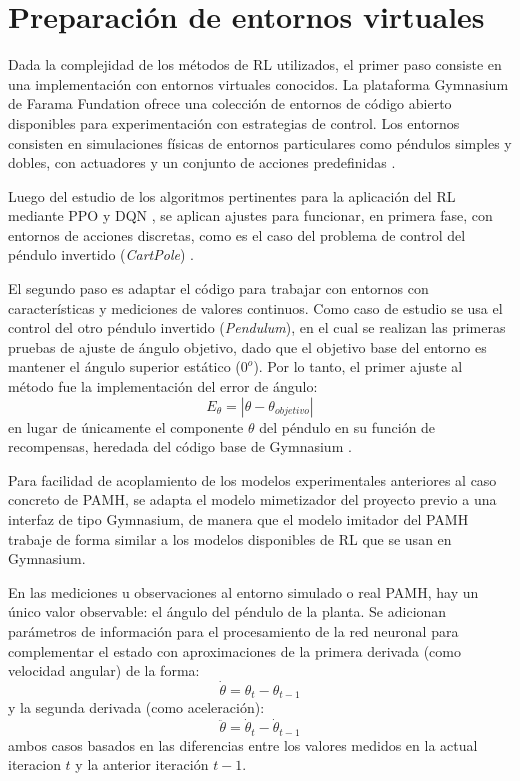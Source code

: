 \section{Preparación de entornos virtuales}

Dada la complejidad de los métodos de RL utilizados, el primer paso consiste en una implementación con entornos virtuales conocidos. La plataforma Gymnasium de Farama Fundation \cite{Gymnasium} ofrece una colección de entornos de código abierto disponibles para experimentación con estrategias de control. Los entornos consisten en simulaciones físicas de entornos particulares como péndulos simples y dobles, con actuadores y un conjunto de acciones predefinidas \cite{Gymnasium}.  

Luego del estudio de los algoritmos pertinentes para la aplicación del RL mediante PPO y DQN \cite{PPObase} \cite{DQNbase}, se aplican ajustes para funcionar, en primera fase, con entornos de acciones discretas, como es el caso del problema de control del péndulo invertido (\textit{CartPole}) \cite{Gymnasium}.

El segundo paso es adaptar el código para trabajar con entornos con características y mediciones de valores continuos. Como caso de estudio se usa el control del otro péndulo invertido (\textit{Pendulum}), en el cual se realizan las primeras pruebas de ajuste de ángulo objetivo, dado que el objetivo base del entorno es mantener el ángulo superior estático ($0^o$). Por lo tanto, el primer ajuste al método fue la implementación del error de ángulo:
\begin{equation}
E_{\theta} = |\theta - \theta_{objetivo}|
\label{ecu:errorangular}
\end{equation}
en lugar de únicamente el componente $\theta$ del péndulo en su función de recompensas, heredada del código base de Gymnasium \cite{Gymnasium}.

Para facilidad de acoplamiento de los modelos experimentales anteriores al caso concreto de PAMH, se adapta el modelo mimetizador del proyecto previo \cite{JorgeBrenes} a una interfaz de tipo Gymnasium, de manera que el modelo imitador del PAMH trabaje de forma similar a los modelos disponibles de RL que se usan en Gymnasium.

En las mediciones u observaciones al entorno simulado o real PAMH, hay un único valor observable: el ángulo del péndulo de la planta. Se adicionan parámetros de información para el procesamiento de la red neuronal para complementar el estado con aproximaciones de la primera derivada (como velocidad angular) de la forma:
\begin{equation}
\dot{\theta} = \theta_t - \theta_{t-1}
\end{equation}
y la segunda derivada (como aceleración):
\begin{equation}
\ddot{\theta} = \dot{\theta}_t - \dot{\theta}_{t-1}
\end{equation}
ambos casos basados en las diferencias entre los valores medidos en la actual iteracion $t$ y la anterior iteración $t-1$. 

